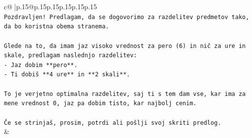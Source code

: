 \documentclass{article}
\begin{document}
{\begin{supertabular}{c@{$\;$}|p{.15\linewidth}@{}p{.15\linewidth}p{.15\linewidth}p{.15\linewidth}p{.15\linewidth}p{.15\linewidth}}
{{{\\ 
\texttt{Pozdravljen! Predlagam, da se dogovorimo za razdelitev predmetov tako, da bo koristna obema stranema.} \\
\\ 
\texttt{Glede na to, da imam jaz visoko vrednost za pero (6) in nič za ure in skale, predlagam naslednjo razdelitev:} \\
\texttt{{-} Jaz dobim **pero**.} \\
\texttt{{-} Ti dobiš **4 ure** in **2 skali**.} \\
\\ 
\texttt{To je verjetno optimalna razdelitev, saj ti s tem dam vse, kar ima za mene vrednost 0, jaz pa dobim tisto, kar najbolj cenim.} \\
\\ 
\texttt{Če se strinjaš, prosim, potrdi ali pošlji svoj skriti predlog.} \\
            }
        }
    }
    & \\ \\


\end{supertabular}}
\end{document}
